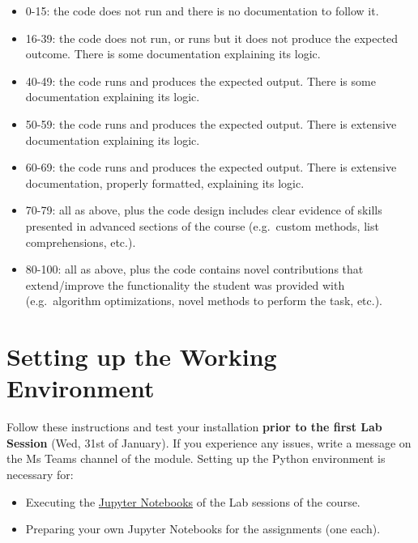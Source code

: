 \documentclass[
  letterpaper,
  DIV=11,
  numbers=noendperiod]{scrreprt}
\providecommand{\tightlist}{%
  \setlength{\itemsep}{0pt}\setlength{\parskip}{0pt}}\usepackage{longtable,booktabs,array}
\begin{document}
\begin{itemize}
\tightlist
\item
  0-15: the code does not run and there is no documentation to follow
  it.
\item
  16-39: the code does not run, or runs but it does not produce the
  expected outcome. There is some documentation explaining its logic.
\item
  40-49: the code runs and produces the expected output. There is some
  documentation explaining its logic.
\item
  50-59: the code runs and produces the expected output. There is
  extensive documentation explaining its logic.
\item
  60-69: the code runs and produces the expected output. There is
  extensive documentation, properly formatted, explaining its logic.
\item
  70-79: all as above, plus the code design includes clear evidence of
  skills presented in advanced sections of the course (e.g.~custom
  methods, list comprehensions, etc.).
\item
  80-100: all as above, plus the code contains novel contributions that
  extend/improve the functionality the student was provided with
  (e.g.~algorithm optimizations, novel methods to perform the task,
  etc.).
\end{itemize}


\chapter*{Setting up the Working
Environment}\label{setting-up-the-working-environment}


Follow these instructions and test your installation \textbf{prior to
the first Lab Session} (Wed, 31st of January). If you experience any
issues, write a message on the Ms Teams channel of the module. Setting
up the Python environment is necessary for:

\begin{itemize}
\tightlist
\item
  Executing the \href{https://docs.jupyter.org/en/latest/}{Jupyter
  Notebooks} of the Lab sessions of the course.
\item
  Preparing your own Jupyter Notebooks for the assignments (one each).
\end{itemize}
\end{document}

